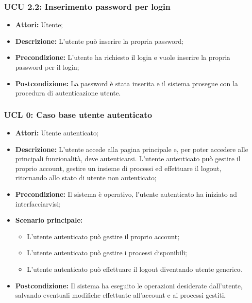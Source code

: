 \hypertarget{U2.2}{}
\subsubsection{UCU 2.2: Inserimento password per login}
\begin{itemize}
\item \textbf{Attori:} Utente;
\item \textbf{Descrizione:} L'utente può inserire la propria password;
\item \textbf{Precondizione:} L'utente ha richiesto il login e vuole inserire la propria password per il login;
\item \textbf{Postcondizione:} La password è stata inserita e il sistema prosegue con la procedura di autenticazione utente.
\end{itemize}

\hypertarget{L0}{}
\subsubsection{UCL 0: Caso base utente autenticato}
\begin{itemize}
\item \textbf{Attori:} Utente autenticato;
\item \textbf{Descrizione:} L'utente accede alla pagina principale e, per poter accedere alle principali funzionalità, deve autenticarsi.
L'utente autenticato può gestire il proprio account, gestire un insieme di processi ed effettuare il logout, ritornando allo stato di utente non autenticato;
\item \textbf{Precondizione:} Il sistema è operativo, l'utente autenticato ha iniziato ad interfacciarvisi;
\item \textbf{Scenario principale:}
\begin{itemize}
\item L'utente autenticato può gestire il proprio account;
\item L'utente autenticato può gestire i processi disponibili;
\item L'utente autenticato può effettuare il logout diventando utente generico.
\end{itemize}
\item \textbf{Postcondizione:} Il sistema ha eseguito le operazioni desiderate dall'utente, salvando eventuali modifiche effettuate all'account e ai processi gestiti.
\end{itemize}

